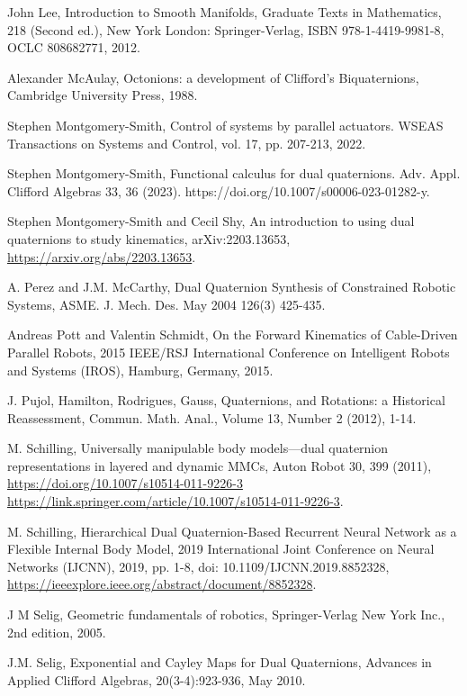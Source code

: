 \documentclass[reqno,12pt]{amsart}
\begin{document}
\begin{thebibliography}{99}
 John Lee, Introduction to Smooth Manifolds, Graduate Texts in Mathematics, 218 (Second ed.), New York London: Springer-Verlag, ISBN 978-1-4419-9981-8, OCLC 808682771, 2012.

 Alexander McAulay, Octonions: a development of Clifford's Biquaternions, Cambridge University Press, 1988.

 Stephen Montgomery-Smith, Control of systems by parallel actuators. WSEAS Transactions on Systems and Control, vol. 17, pp. 207-213, 2022.

 Stephen Montgomery-Smith, Functional calculus for dual quaternions. Adv. Appl. Clifford Algebras 33, 36 (2023). https://doi.org/10.1007/s00006-023-01282-y.

 Stephen Montgomery-Smith and Cecil Shy, An introduction to using dual quaternions to study kinematics, arXiv:2203.13653, \url{https://arxiv.org/abs/2203.13653}.

 A. Perez and J.M. McCarthy, Dual Quaternion Synthesis of Constrained Robotic Systems, ASME. J. Mech. Des. May 2004 126(3) 425-435.

 Andreas Pott and Valentin Schmidt, On the Forward Kinematics of Cable-Driven Parallel Robots, 2015 IEEE/RSJ International Conference on Intelligent Robots and Systems (IROS), Hamburg, Germany, 2015.

 J. Pujol, Hamilton, Rodrigues, Gauss, Quaternions, and Rotations: a Historical Reassessment, Commun. Math. Anal., Volume 13, Number 2 (2012), 1-14.

  M. Schilling, Universally manipulable body models---dual quaternion representations in layered and dynamic MMCs, Auton Robot 30, 399 (2011), \url{https://doi.org/10.1007/s10514-011-9226-3 https://link.springer.com/article/10.1007/s10514-011-9226-3}.

 M. Schilling, Hierarchical Dual Quaternion-Based Recurrent Neural Network as a Flexible Internal Body Model, 2019 International Joint Conference on Neural Networks (IJCNN), 2019, pp. 1-8, doi: 10.1109/IJCNN.2019.8852328, \url{https://ieeexplore.ieee.org/abstract/document/8852328}.

 J M Selig, Geometric fundamentals of robotics, Springer-Verlag New York Inc., 2nd edition, 2005.

 J.M. Selig, Exponential and Cayley Maps for Dual Quaternions, Advances in Applied Clifford Algebras, 20(3-4):923-936, May 2010.


\end{thebibliography}
\end{document}
